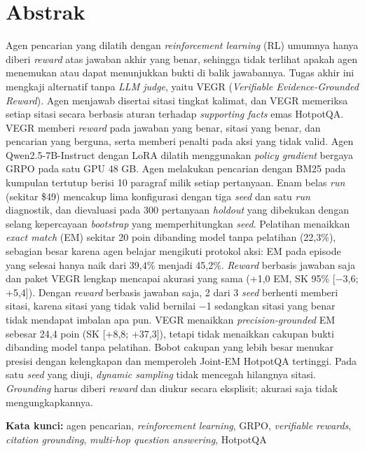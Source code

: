 \chapter*{Abstrak}\label{abstrak}

Agen pencarian yang dilatih dengan \emph{reinforcement learning} (RL)
umumnya hanya diberi \emph{reward} atas jawaban akhir yang benar,
sehingga tidak terlihat apakah agen menemukan atau dapat menunjukkan
bukti di balik jawabannya. Tugas akhir ini mengkaji alternatif tanpa
\emph{LLM judge}, yaitu VEGR (\emph{Verifiable Evidence-Grounded
Reward}). Agen menjawab disertai sitasi tingkat kalimat, dan VEGR
memeriksa setiap sitasi secara berbasis aturan terhadap \emph{supporting
facts} emas HotpotQA. VEGR memberi \emph{reward} pada jawaban yang
benar, sitasi yang benar, dan pencarian yang berguna, serta memberi
penalti pada aksi yang tidak valid. Agen Qwen2.5-7B-Instruct dengan LoRA
dilatih menggunakan \emph{policy gradient} bergaya GRPO pada satu GPU 48
GB. Agen melakukan pencarian dengan BM25 pada kumpulan tertutup berisi
10 paragraf milik setiap pertanyaan. Enam belas \emph{run} (sekitar
\$49) mencakup lima konfigurasi dengan tiga \emph{seed} dan satu
\emph{run} diagnostik, dan dievaluasi pada 300 pertanyaan \emph{holdout}
yang dibekukan dengan selang kepercayaan \emph{bootstrap} yang
memperhitungkan \emph{seed}. Pelatihan menaikkan \emph{exact match} (EM)
sekitar 20 poin dibanding model tanpa pelatihan (22,3\%), sebagian besar
karena agen belajar mengikuti protokol aksi: EM pada episode yang
selesai hanya naik dari 39,4\% menjadi 45,2\%. \emph{Reward} berbasis
jawaban saja dan paket VEGR lengkap mencapai akurasi yang sama (+1,0 EM,
SK 95\% {[}−3,6; +5,4{]}). Dengan \emph{reward} berbasis jawaban saja, 2
dari 3 \emph{seed} berhenti memberi sitasi, karena sitasi yang tidak
valid bernilai −1 sedangkan sitasi yang benar tidak mendapat imbalan apa
pun. VEGR menaikkan \emph{precision-grounded} EM sebesar 24,4 poin (SK
{[}+8,8; +37,3{]}), tetapi tidak menaikkan cakupan bukti dibanding model
tanpa pelatihan. Bobot cakupan yang lebih besar menukar presisi dengan
kelengkapan dan memperoleh Joint-EM HotpotQA tertinggi. Pada satu
\emph{seed} yang diuji, \emph{dynamic sampling} tidak mencegah hilangnya
sitasi. \emph{Grounding} harus diberi \emph{reward} dan diukur secara
eksplisit; akurasi saja tidak mengungkapkannya.

\textbf{Kata kunci:} agen pencarian, \emph{reinforcement learning},
GRPO, \emph{verifiable rewards}, \emph{citation grounding},
\emph{multi-hop question answering}, HotpotQA
